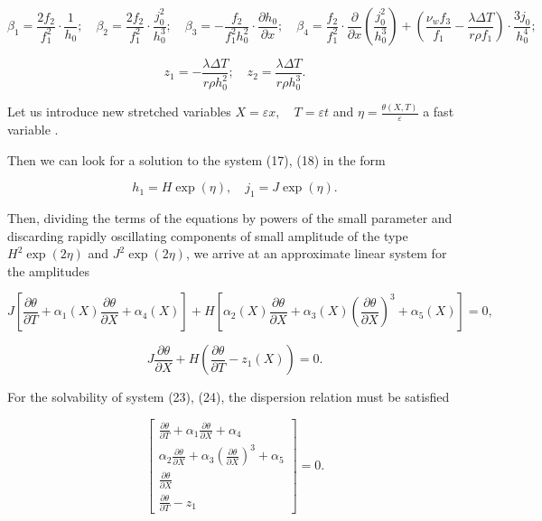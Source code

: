 \begin{equation}
\beta_1 = \frac{2 f_2}{f_1^2} \cdot \frac{1}{h_0};\quad
\beta_2 = \frac{2 f_2}{f_1^2} \cdot \frac{j_0^2}{h_0^3};\quad
\beta_3 = - \frac{f_2}{f_1^2 h_0^2} \cdot \frac{\partial h_0}{\partial x};\quad
\beta_4 = \frac{f_2}{f_1^2} \cdot \frac{\partial}{\partial x} \left( \frac{j_0^2}{h_0^3} \right)
+ \left( \frac{\nu_w f_3}{f_1} - \frac{\lambda \Delta T}{r \rho f_1} \right) \cdot \frac{3 j_0}{h_0^4};\quad
\end{equation}

\begin{equation}
z_1 = - \frac{\lambda \Delta T}{r \rho h_0^2};\quad
z_2 = \frac{\lambda \Delta T}{r \rho h_0^3}.
\end{equation}

Let us introduce new stretched variables $X=\varepsilon x,\quad T=\varepsilon t$
and $\eta=\frac{\theta(X,T)}{\varepsilon}$
a fast variable
.

Then we can look for a solution to the system (17), (18) in the form

\begin{equation}
h_1 = H \exp(\eta), \quad j_1 = J \exp(\eta).
\end{equation}

Then, dividing the terms of the equations by powers of the small
parameter and discarding rapidly oscillating components of small
amplitude of the type $H^2\exp(2\eta)$ and $J^2\exp(2\eta)$, we arrive
at an approx\-imate linear system for the amplitudes

\begin{equation}
J \left[ \frac{\partial \theta}{\partial T} + \alpha_1(X) \frac{\partial \theta}{\partial X} + \alpha_4(X) \right]
+ H \left[ \alpha_2(X) \frac{\partial \theta}{\partial X} + \alpha_3(X) \left( \frac{\partial \theta}{\partial X} \right)^3 + \alpha_5(X) \right] = 0,
\end{equation}

\begin{equation}
J \frac{\partial \theta}{\partial X} + H \left( \frac{\partial \theta}{\partial T} - z_1(X) \right) = 0.
\end{equation}

For the solvability of system (23), (24), the dispersion relation must
be satisfied

\begin{equation}
\left[
\begin{matrix}
\frac{\partial \theta}{\partial T} + \alpha_1 \frac{\partial \theta}{\partial X} + \alpha_4 \\
\alpha_2 \frac{\partial \theta}{\partial X} + \alpha_3 \left( \frac{\partial \theta}{\partial X} \right)^3 + \alpha_5 \\
\frac{\partial \theta}{\partial X} \\
\frac{\partial \theta}{\partial T} - z_1
\end{matrix}
\right]
= 0.
\end{equation}


